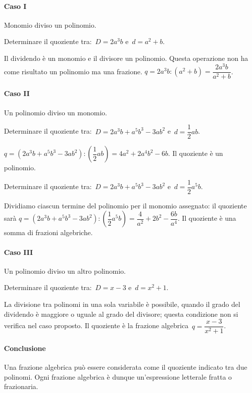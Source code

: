 \paragraph{Caso I }Monomio diviso un polinomio.
\begin{itemize*}
 \item Determinare il quoziente tra:~$D=2a^{3}b$ e~$d=a^{2}+b$.
\end{itemize*}
Il dividendo è un monomio e il divisore un polinomio.
Questa operazione non ha come risultato un polinomio ma una
frazione. $q=2a^{3}b:\left(a^{2}+b\right)=\dfrac{2a^{3}b}{a^{2}+b}$.

\paragraph{Caso II}Un polinomio diviso un monomio.
\begin{itemize*}
 \item Determinare il quoziente tra:~$D=2a^{3}b+a^{5}b^{3}-3ab^{2}$ e~$d=\dfrac{1}{2}ab$.
\end{itemize*}
$q=\left(2a^{3}b+a^{5}b^{3}-3ab^{2}\right):\left(\dfrac{1}{2}ab\right)=4a^{2}+2a^{4}b^{2}-6b$.
Il quoziente è un polinomio.
\begin{itemize*}
 \item Determinare il quoziente tra:~$D=2a^{3}b+a^{5}b^{3}-3ab^{2}$ e~$d=\dfrac{1}{2}a^{5}b$.
\end{itemize*}
Dividiamo ciascun termine del polinomio per il monomio assegnato: il quoziente sarà
$q=\left(2a^{3}b+a^{5}b^{3}-3ab^{2}\right):\left(\dfrac{1}{2}a^{5}b\right)=\dfrac{4}{a^{2}}+2b^{2}-\dfrac{6b}{a^{4}}$.
Il quoziente è una somma di frazioni algebriche.

\paragraph{Caso III}Un polinomio diviso un altro polinomio.
\begin{itemize*}
 \item Determinare il quoziente tra:~$D=x-3$ e~$d=x^{2}+1$.
\end{itemize*}
La divisione tra polinomi in una sola variabile è possibile, quando il grado del dividendo è maggiore o uguale al grado del divisore;
questa condizione non si verifica nel caso proposto.
Il quoziente è la frazione algebrica~$q=\dfrac{x-3}{x^{2}+1}$.

\paragraph{Conclusione}Una frazione algebrica può essere considerata come il quoziente indicato tra due polinomi.
Ogni frazione algebrica è dunque un’espressione letterale fratta o frazionaria.

